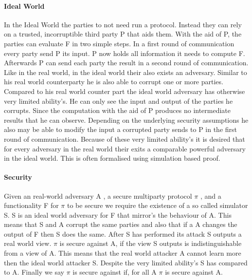 \paragraph{Ideal World}
In the Ideal World the parties to not need run a protocol. Instead they can rely on a trusted, incorruptible third party P that aids them. With the aid of P, the parties can evaluate F in two simple steps. In a first round of communication every party send P its input. P now holds all information it needs to compute F. Afterwards P can send each party the result in a second round of communication. Like in the real world, in the ideal world their also exists an adversary. Similar to his real world counterparty he is also able to corrupt one or more parties.    Compared to his real world counter part the ideal world adversary has otherwise very limited ability's. He can only see the input and output of the parties he corrupts. Since the computation with the aid of P produces no intermediate results that he can observe. Depending on the underlying security assumptions he also may be able to modify the input a corrupted party sends to P in the first round of communication. Because of these very limited ability's it is desired that for every adversary in the real world their exits a comparable powerful adversary in the ideal world. This is often formalised using simulation based proof.

\paragraph{Security}
Given an real-world adversary A , a secure multiparty protocol $\pi $ , and a functionality F for $\pi $ to be secure we require the existence of a so called simulator S.
S is an ideal world adversary for F that mirror's the behaviour of A. This means that S and A corrupt the same parties and also that if a A changes the output of F then S does the same. After S has performed its attack S outputs a real world view. $\pi $ is secure against A, if the view S outputs is indistinguishable from a view of A. This means that the real world attacker A cannot learn more then the ideal world attacker S. Despite the very limited ability's S has compared to A. Finally we say $\pi $  is secure against if, for all A $\pi $ is secure against A. 






















